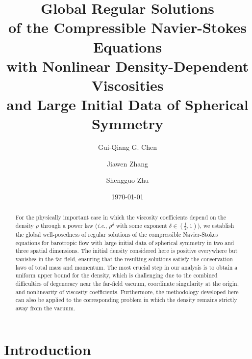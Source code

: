 \documentclass[11pt,reqno]{amsart}
\title[Degenerate compressible Navier--Stokes equations]{Global Regular Solutions \\[0.5mm]
of the Compressible Navier-Stokes Equations \\[0.5mm]
with Nonlinear Density-Dependent Viscosities\\[0.5mm] 
and Large Initial Data of Spherical Symmetry}
\date{\today}
\author{Gui-Qiang G. Chen}
\author{Jiawen Zhang}
\author{Shengguo Zhu }
\numberwithin{rk}{section}
\numberwithin{prop}{section}
\numberwithin{mydef}{section}
\numberwithin{lem}{section}
\numberwithin{equation}{section}
\numberwithin{thm}{section}
\begin{document}
\begin{abstract}
For the physically important case in which the viscosity coefficients depend on the density $\rho$ through a power law  ({\it i.e.}, $\rho^\delta$ with some exponent $\delta \in (\frac{1}{2},1)$), we establish the global well-posedness of regular solutions of the compressible Navier-Stokes equations for barotropic flow with large initial data of spherical symmetry in two and three spatial dimensions. The initial density considered here is positive everywhere but vanishes in the far field, ensuring that the resulting solutions satisfy the conservation laws of total mass and momentum. 
The most crucial step in our analysis is to obtain a uniform upper bound for the density, which is challenging due to the combined difficulties of degeneracy near the far-field vacuum, coordinate singularity at the origin, and nonlinearity of viscosity coefficients. 
Furthermore, the methodology developed here can also be applied to the corresponding problem in which the density remains strictly away from the vacuum.





\end{abstract}




\maketitle

\tableofcontents

\section{Introduction}
\end{document}
